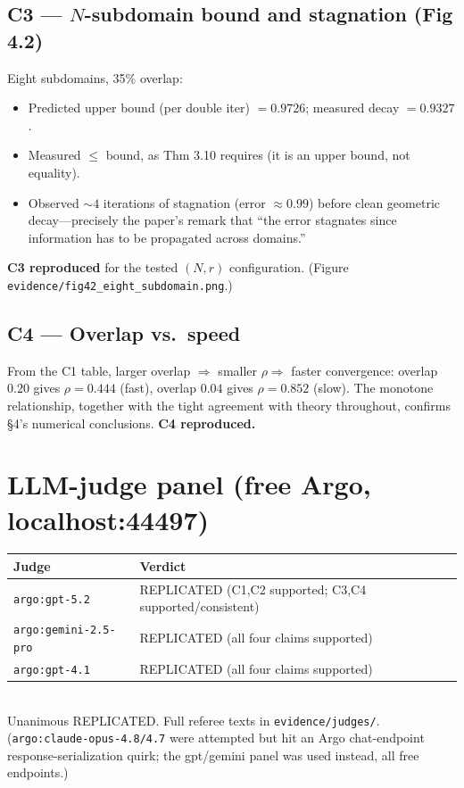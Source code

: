 \documentclass[11pt]{article}
\begin{document}
\subsection*{C3 --- $N$-subdomain bound and stagnation (Fig 4.2)}
Eight subdomains, 35\% overlap:
\begin{itemize}
\item Predicted upper bound (per double iter) $=0.9726$; measured decay $=0.9327$.
\item Measured $\le$ bound, as Thm 3.10 requires (it is an upper bound, not equality).
\item Observed $\sim 4$ iterations of stagnation (error $\approx 0.99$) before clean
geometric decay---precisely the paper's remark that ``the error stagnates since information
has to be propagated across domains.''
\end{itemize}
\textbf{C3 reproduced} for the tested $(N,r)$ configuration.
(Figure \texttt{evidence/fig42\_eight\_subdomain.png}.)

\subsection*{C4 --- Overlap vs.\ speed}
From the C1 table, larger overlap $\Rightarrow$ smaller $\rho \Rightarrow$ faster
convergence: overlap $0.20$ gives $\rho=0.444$ (fast), overlap $0.04$ gives $\rho=0.852$
(slow). The monotone relationship, together with the tight agreement with theory
throughout, confirms \S 4's numerical conclusions. \textbf{C4 reproduced.}

\section{LLM-judge panel (free Argo, localhost:44497)}
\begin{tabular}{ll}
\toprule
Judge & Verdict \\
\midrule
\texttt{argo:gpt-5.2}         & REPLICATED (C1,C2 supported; C3,C4 supported/consistent) \\
\texttt{argo:gemini-2.5-pro}  & REPLICATED (all four claims supported) \\
\texttt{argo:gpt-4.1}         & REPLICATED (all four claims supported) \\
\bottomrule
\end{tabular}\\[4pt]
Unanimous REPLICATED. Full referee texts in \texttt{evidence/judges/}.
(\texttt{argo:claude-opus-4.8/4.7} were attempted but hit an Argo chat-endpoint
response-serialization quirk; the gpt/gemini panel was used instead, all free endpoints.)
\end{document}
